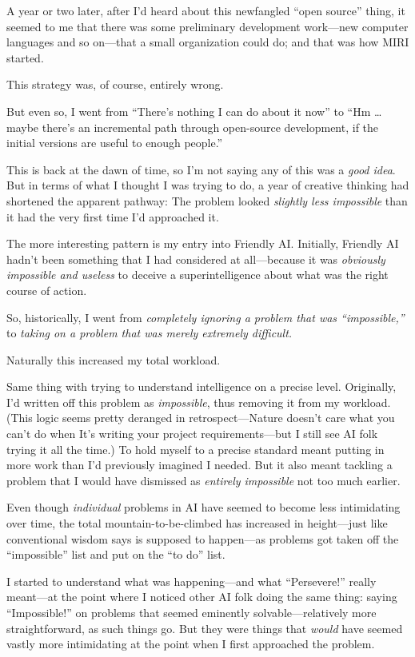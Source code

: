 {
 A year or two later, after I'd heard about this
newfangled ``open source'' thing, it
seemed to me that there was some preliminary development work---new
computer languages and so on---that a small organization could do; and
that was how MIRI started.}

{
 This strategy was, of course, entirely wrong.}

{
 But even so, I went from
``There's nothing I can do about it
now'' to ``Hm \ldots maybe
there's an incremental path through open-source
development, if the initial versions are useful to enough
people.''}

{
 This is back at the dawn of time, so I'm not
saying any of this was a \textit{good idea}. But in terms of what I
thought I was trying to do, a year of creative thinking had shortened
the apparent pathway: The problem looked \textit{slightly less
impossible} than it had the very first time I'd
approached it.}

{
 The more interesting pattern is my entry into Friendly AI.
Initially, Friendly AI hadn't been something that I had
considered at all---because it was \textit{obviously impossible and
useless} to deceive a superintelligence about what was the right course
of action.}

{
 So, historically, I went from \textit{completely ignoring a
problem that was ``impossible,''} to
\textit{taking on a problem that was merely extremely difficult.}}

{
 Naturally this increased my total workload.}

{
 Same thing with trying to understand intelligence on a precise
level. Originally, I'd written off this problem as
\textit{impossible}, thus removing it from my workload. (This logic
seems pretty deranged in retrospect---Nature doesn't
care what you can't do when It's
writing your project requirements---but I still see AI folk trying it
all the time.) To hold myself to a precise standard meant putting in
more work than I'd previously imagined I needed. But it
also meant tackling a problem that I would have dismissed as
\textit{entirely impossible} not too much earlier.}

{
 Even though \textit{individual} problems in AI have seemed to
become less intimidating over time, the total mountain-to-be-climbed
has increased in height---just like conventional wisdom says is
supposed to happen---as problems got taken off the
``impossible'' list and put on the
``to do'' list.}

{
 I started to understand what was happening---and what
``Persevere!'' really meant---at the
point where I noticed other AI folk doing the same thing: saying
``Impossible!'' on problems that
seemed eminently solvable---relatively more straightforward, as such
things go. But they were things that \textit{would} have seemed vastly
more intimidating at the point when I first approached the problem.}

